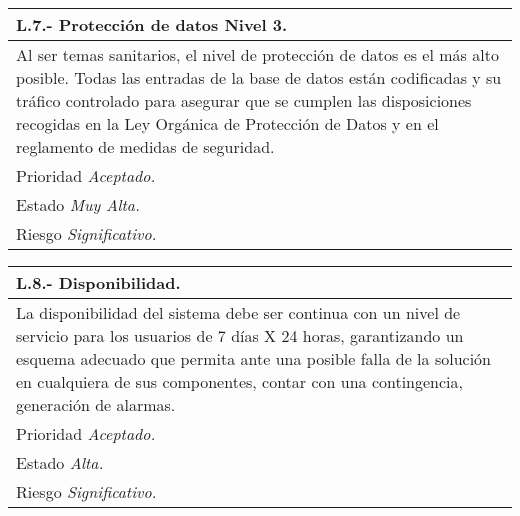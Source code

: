 \documentclass[a4paper,oneside,11pt]{book}
\begin{document}
\begin{center}
\begin{tabulary}{15cm}{|L|}
	\hline
		\bf{L.7.- Protección de datos Nivel 3.} \\
	\hline
		Al ser temas sanitarios, el nivel de protección de datos es el más alto posible. Todas las entradas de la base de datos están codificadas y su tráfico controlado para asegurar que se cumplen las disposiciones recogidas en la Ley Orgánica de Protección de Datos y en el reglamento de medidas de seguridad. \\
	\hline
		Prioridad \textit{Aceptado.} \\
	\hline
		Estado \textit{Muy Alta.} \\
	\hline
		Riesgo \textit{Significativo.} \\
	\hline
\end{tabulary}
\end{center}

\begin{center}
\begin{tabulary}{15cm}{|L|}
	\hline
		\bf{L.8.- Disponibilidad.} \\
	\hline
		La disponibilidad del sistema debe ser continua con un nivel de servicio para los usuarios de 7 días X 24 horas, garantizando un esquema adecuado que permita ante una posible falla de la solución en cualquiera de sus componentes, contar con una contingencia, generación de alarmas. \\
	\hline
		Prioridad \textit{Aceptado.} \\
	\hline
		Estado \textit{Alta.} \\
	\hline
		Riesgo \textit{Significativo.} \\
	\hline
\end{tabulary}
\end{center}
\end{document}
